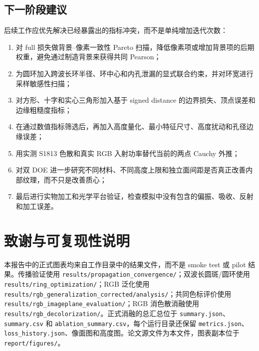 \documentclass[UTF8,a4paper,12pt]{ctexart}
\begin{document}
\subsection{下一阶段建议}
后续工作应优先解决已经暴露出的指标冲突，而不是单纯增加迭代次数：
\begin{enumerate}
\item 对 full 损失做背景--像素一致性 Pareto 扫描，降低像素项或增加背景项的后期权重，避免通过制造背景来获得共同 Pearson；
\item 为圆环加入跨波长环半径、环中心和内孔泄漏的显式联合约束，并对环宽进行采样敏感性扫描；
\item 对方形、十字和实心三角形加入基于 signed distance 的边界损失、顶点误差和边缘粗糙度指标；
\item 在通过数值指标筛选后，再加入高度量化、最小特征尺寸、高度扰动和孔径边缘误差；
\item 用实测 S1813 色散和真实 RGB 入射功率替代当前的两点 Cauchy 外推；
\item 对双 DOE 进一步研究不同材料、不同高度上限和独立面间距是否真正改善内部纹理，而不只是改善质心；
\item 最后进行实物加工和光学平台验证，检查模拟中没有包含的偏振、吸收、反射和加工误差。
\end{enumerate}

\section*{致谢与可复现性说明}
本报告中的正式图表均来自工作目录中的结果文件，而不是 smoke test 或 pilot 结果。传播验证使用 \texttt{results/propagation\_convergence/}；双波长圆斑/圆环使用 \texttt{results/ring\_optimization/}；RGB 泛化使用 \texttt{results/rgb\_generalization\_corrected/analysis/}；共同色标评价使用 \texttt{results/rgb\_imageplane\_evaluation/}；RGB 消色散消融使用 \texttt{results/rgb\_decolorization/}。正式消融的总汇总位于 \texttt{summary.json}、\texttt{summary.csv} 和 \texttt{ablation\_summary.csv}，每个运行目录还保留 \texttt{metrics.json}、\texttt{loss\_history.json}、像面图和高度图。论文源文件为本文件，图表副本位于 \texttt{report/figures/}。

\appendix
\end{document}
